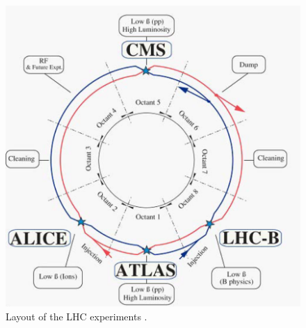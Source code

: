 \begin{figure}[hbtp]
\centering
\includegraphics[scale=0.25]{figures/lhc_and_cms/lhc_layout.png}
\caption{Layout of the LHC experiments \cite{lhc_machine}.}
\label{lhc_layout}
\end{figure}